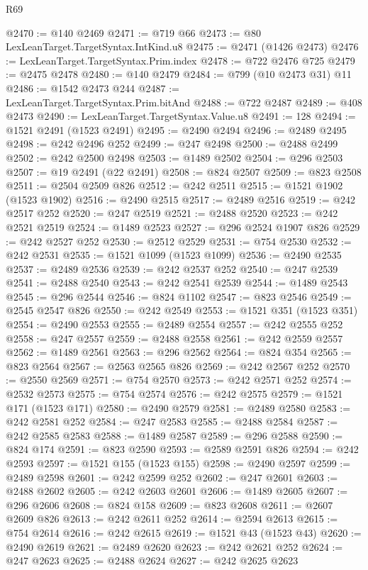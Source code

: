 \begin{lexlean}{R69}
\begin{coremodule}
{@2470 := @140 @2469
@2471 := @719 @66
@2473 := @80 LexLeanTarget.TargetSyntax.IntKind.u8
@2475 := @2471 (@1426 @2473)
@2476 := LexLeanTarget.TargetSyntax.Prim.index
@2478 := @722 @2476 @725
@2479 := @2475 @2478
@2480 := @140 @2479
@2484 := @799 (@10 @2473 @31) @11
@2486 := @1542 @2473 @244
@2487 := LexLeanTarget.TargetSyntax.Prim.bitAnd
@2488 := @722 @2487
@2489 := @408 @2473
@2490 := LexLeanTarget.TargetSyntax.Value.u8
@2491 := 128
@2494 := @1521 @2491 (@1523 @2491)
@2495 := @2490 @2494
@2496 := @2489 @2495
@2498 := @242 @2496 @252
@2499 := @247 @2498
@2500 := @2488 @2499
@2502 := @242 @2500 @2498
@2503 := @1489 @2502
@2504 := @296 @2503
@2507 := @19 @2491 (@22 @2491)
@2508 := @824 @2507
@2509 := @823 @2508
@2511 := @2504 @2509 @826
@2512 := @242 @2511
@2515 := @1521 @1902 (@1523 @1902)
@2516 := @2490 @2515
@2517 := @2489 @2516
@2519 := @242 @2517 @252
@2520 := @247 @2519
@2521 := @2488 @2520
@2523 := @242 @2521 @2519
@2524 := @1489 @2523
@2527 := @296 @2524 @1907 @826
@2529 := @242 @2527 @252
@2530 := @2512 @2529
@2531 := @754 @2530
@2532 := @242 @2531
@2535 := @1521 @1099 (@1523 @1099)
@2536 := @2490 @2535
@2537 := @2489 @2536
@2539 := @242 @2537 @252
@2540 := @247 @2539
@2541 := @2488 @2540
@2543 := @242 @2541 @2539
@2544 := @1489 @2543
@2545 := @296 @2544
@2546 := @824 @1102
@2547 := @823 @2546
@2549 := @2545 @2547 @826
@2550 := @242 @2549
@2553 := @1521 @351 (@1523 @351)
@2554 := @2490 @2553
@2555 := @2489 @2554
@2557 := @242 @2555 @252
@2558 := @247 @2557
@2559 := @2488 @2558
@2561 := @242 @2559 @2557
@2562 := @1489 @2561
@2563 := @296 @2562
@2564 := @824 @354
@2565 := @823 @2564
@2567 := @2563 @2565 @826
@2569 := @242 @2567 @252
@2570 := @2550 @2569
@2571 := @754 @2570
@2573 := @242 @2571 @252
@2574 := @2532 @2573
@2575 := @754 @2574
@2576 := @242 @2575
@2579 := @1521 @171 (@1523 @171)
@2580 := @2490 @2579
@2581 := @2489 @2580
@2583 := @242 @2581 @252
@2584 := @247 @2583
@2585 := @2488 @2584
@2587 := @242 @2585 @2583
@2588 := @1489 @2587
@2589 := @296 @2588
@2590 := @824 @174
@2591 := @823 @2590
@2593 := @2589 @2591 @826
@2594 := @242 @2593
@2597 := @1521 @155 (@1523 @155)
@2598 := @2490 @2597
@2599 := @2489 @2598
@2601 := @242 @2599 @252
@2602 := @247 @2601
@2603 := @2488 @2602
@2605 := @242 @2603 @2601
@2606 := @1489 @2605
@2607 := @296 @2606
@2608 := @824 @158
@2609 := @823 @2608
@2611 := @2607 @2609 @826
@2613 := @242 @2611 @252
@2614 := @2594 @2613
@2615 := @754 @2614
@2616 := @242 @2615
@2619 := @1521 @43 (@1523 @43)
@2620 := @2490 @2619
@2621 := @2489 @2620
@2623 := @242 @2621 @252
@2624 := @247 @2623
@2625 := @2488 @2624
@2627 := @242 @2625 @2623
}
\end{coremodule}
\end{lexlean}
